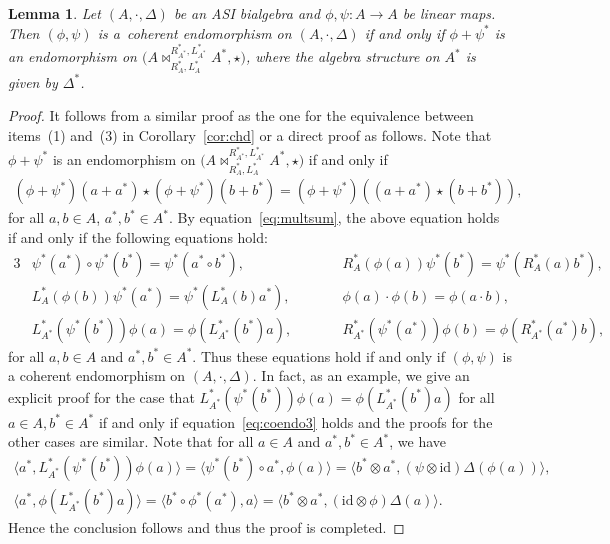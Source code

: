 \documentclass[10pt,a4paper]{amsart}
\numberwithin{equation}{section}
\newtheorem{Lemma}[Theorem]{Lemma}
\newcommand{\id}{\mathrm{id}}
\begin{document}
\begin{Lemma}\label{lem:endo}
 Let $(A, \cdot, \Delta)$ be an ASI bialgebra and $\phi, \psi\colon A \to A$ be linear maps.
 Then $(\phi, \psi)$ is a~coherent endomorphism on $(A, \cdot, \Delta)$ if and only if $\phi + \psi^*$ is an endomorphism on ${\big(A \bowtie_{R_A^*, L_A^*}^{R_{A^*}^*, L_{A^*}^*} A^*, \star\big)}$, where the algebra structure on $A^*$ is given by $\Delta^*$.
\end{Lemma}
\begin{proof}
It follows from a similar proof as the one for the equivalence between items~(1) and~(3) in Corollary~\ref{cor:chd} or a direct proof as follows.
Note that $\phi + \psi^*$ is an endomorphism on ${\big(A \bowtie_{R_A^*, L_A^*}^{R_{A^*}^*, L_{A^*}^*} A^*, \star\big)}$ if and only if
 \begin{gather*}
 (\phi + \psi^*)(a + a^*) \star (\phi + \psi^*)(b+b^*) = (\phi + \psi^*)((a+a^*) \star (b+b^*)),
 \end{gather*}
for all $a, b \in A$, $a^*, b^* \in A^*$. By equation~\eqref{eq:multsum}, the above equation holds if and only if the following equations hold:
 \begin{alignat*}{3}
 &\psi^*(a^*) \circ \psi^*(b^*) = \psi^*(a^* \circ b^*), \qquad&&R_{A}^*(\phi(a))\psi^*(b^*) = \psi^*(R_{A}^*(a) b^*),& \\
 &L_{A}^*(\phi(b))\psi^*(a^*) = \psi^*(L_{A}^*(b) a^*), \qquad&& \phi(a) \cdot \phi(b) = \phi(a \cdot b),& \\
 &L_{A^*}^*(\psi^*(b^*))\phi(a) = \phi(L_{A^*}^*(b^*) a), \qquad &&R_{A^*}^*(\psi^*(a^*))\phi(b) = \phi(R_{A^*}^*(a^*) b),&
 \end{alignat*}
 for all $a, b \in A$ and $a^*, b^* \in A^*$. Thus these equations hold if and only if $(\phi, \psi)$ is a coherent endomorphism on $(A, \cdot,
 \Delta)$. In fact, as an example, we give an explicit proof for the case that $L_{A^*}^*(\psi^*(b^*))\phi(a) = \phi(L_{A^*}^*(b^*) a)$ for all $a\in A, b^*\in A^*$ if and only if equation~\eqref{eq:coendo3}
 holds and the proofs for the other cases are similar. Note
 that for all $a \in A$ and $a^*, b^* \in A^*$, we have
 \begin{gather*}
 \langle a^*, L_{A^*}^*(\psi^*(b^*))\phi(a)\rangle = \langle \psi^*(b^*) \circ a^*, \phi(a)\rangle = \langle b^* \otimes a^*, (\psi \otimes \id)\Delta(\phi(a))\rangle, \\
 \langle a^*, \phi(L_{A^*}^*(b^*) a)\rangle = \langle b^* \circ \phi^*(a^*), a\rangle = \langle b^* \otimes a^*, (\id \otimes
 \phi)\Delta(a)\rangle.
 \end{gather*}
 Hence the conclusion follows and thus the proof is completed.
\end{proof}
\end{document}
